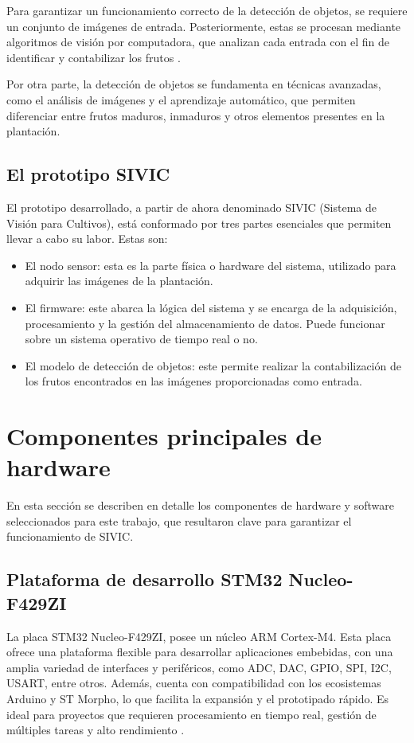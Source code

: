 Para garantizar un funcionamiento correcto de la detección de objetos, se requiere un conjunto de imágenes de entrada. Posteriormente, estas se procesan mediante algoritmos de visión por computadora, que analizan cada entrada con el fin de identificar y contabilizar los frutos \citep{Montiel2019}.

Por otra parte, la detección de objetos se fundamenta en técnicas avanzadas, como el análisis de imágenes y el aprendizaje automático, que permiten diferenciar entre frutos maduros, inmaduros y otros elementos presentes en la plantación.

\newpage

\subsection{El prototipo SIVIC}

El prototipo desarrollado, a partir de ahora denominado SIVIC (Sistema de Visión para Cultivos), está conformado por tres partes esenciales que permiten llevar a cabo su labor. Estas son:
\begin{itemize}
\item El nodo sensor: esta es la parte física o hardware del sistema, utilizado para adquirir las imágenes de la plantación.
\item El firmware: este abarca la lógica del sistema y se encarga de la adquisición, procesamiento y la gestión del almacenamiento de datos. Puede funcionar sobre un sistema operativo de tiempo real o no.
\item El modelo de detección de objetos: este permite realizar la contabilización de los frutos encontrados en las imágenes proporcionadas como entrada.
\end{itemize}

\section{Componentes principales de hardware}

En esta sección se describen en detalle los componentes de hardware y software seleccionados para este trabajo, que resultaron clave para garantizar el funcionamiento de SIVIC.

\subsection{Plataforma de desarrollo STM32 Nucleo-F429ZI}
\label{subsec:F429ZI}

La placa STM32 Nucleo-F429ZI, posee un núcleo ARM Cortex-M4. Esta placa ofrece una plataforma flexible para desarrollar aplicaciones embebidas, con una amplia variedad de interfaces y periféricos, como ADC, DAC, GPIO, SPI, I2C, USART, entre otros. Además, cuenta con compatibilidad con los ecosistemas Arduino y ST Morpho, lo que facilita la expansión y el prototipado rápido. Es ideal para proyectos que requieren procesamiento en tiempo real, gestión de múltiples tareas y alto rendimiento \citep{WEBSITE:Itt2024}.

